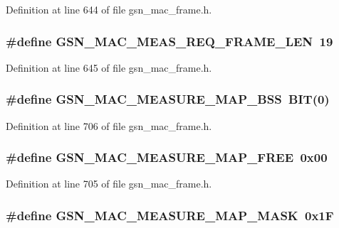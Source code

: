 Definition at line 644 of file gsn\_\-mac\_\-frame.h.

\hypertarget{a00523_ac1906e59af83c227fc7e54ef5b4a6d27}{
\subsubsection[{GSN\_\-MAC\_\-MEAS\_\-REQ\_\-FRAME\_\-LEN}]{\setlength{\rightskip}{0pt plus 5cm}\#define GSN\_\-MAC\_\-MEAS\_\-REQ\_\-FRAME\_\-LEN~19}}
\label{a00523_ac1906e59af83c227fc7e54ef5b4a6d27}


Definition at line 645 of file gsn\_\-mac\_\-frame.h.

\hypertarget{a00523_ab86283d994d2598f6f16aa9c93426950}{
\subsubsection[{GSN\_\-MAC\_\-MEASURE\_\-MAP\_\-BSS}]{\setlength{\rightskip}{0pt plus 5cm}\#define GSN\_\-MAC\_\-MEASURE\_\-MAP\_\-BSS~BIT(0)}}
\label{a00523_ab86283d994d2598f6f16aa9c93426950}


Definition at line 706 of file gsn\_\-mac\_\-frame.h.

\hypertarget{a00523_a56033553d909fc49f89399c963086564}{
\subsubsection[{GSN\_\-MAC\_\-MEASURE\_\-MAP\_\-FREE}]{\setlength{\rightskip}{0pt plus 5cm}\#define GSN\_\-MAC\_\-MEASURE\_\-MAP\_\-FREE~0x00}}
\label{a00523_a56033553d909fc49f89399c963086564}


Definition at line 705 of file gsn\_\-mac\_\-frame.h.

\hypertarget{a00523_a8dfbf547e36ce725b3eb1dd33be5ef82}{
\subsubsection[{GSN\_\-MAC\_\-MEASURE\_\-MAP\_\-MASK}]{\setlength{\rightskip}{0pt plus 5cm}\#define GSN\_\-MAC\_\-MEASURE\_\-MAP\_\-MASK~0x1F}}
\label{a00523_a8dfbf547e36ce725b3eb1dd33be5ef82}


